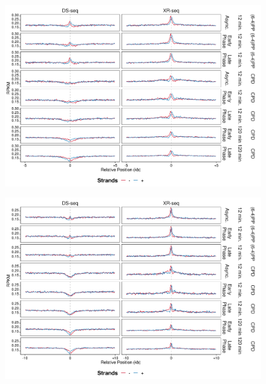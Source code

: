 \begin{figure}[H]
\begin{center}
\includegraphics[width=\textwidth]{Chapters/7_appendix/figures/supfig47}
\caption[]{}
\label{supfig:}
\end{center}
\end{figure}

\begin{figure}[H]
\begin{center}
\includegraphics[width=\textwidth]{Chapters/7_appendix/figures/supfig48}
\caption[]{}
\label{supfig:}
\end{center}
\end{figure}

